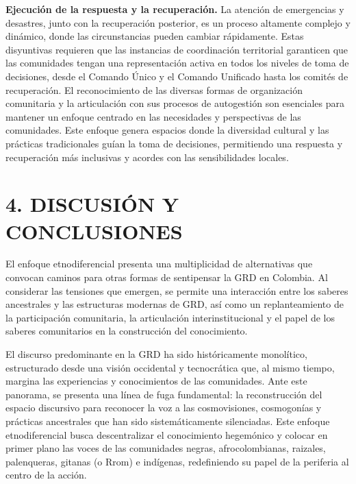\documentclass[
  spanish,
  letterpaper,
]{book}
\begin{document}
\textbf{Ejecución de la respuesta y la recuperación.} La atención de
emergencias y desastres, junto con la recuperación posterior, es un
proceso altamente complejo y dinámico, donde las circunstancias pueden
cambiar rápidamente. Estas disyuntivas requieren que las instancias de
coordinación territorial garanticen que las comunidades tengan una
representación activa en todos los niveles de toma de decisiones, desde
el Comando Único y el Comando Unificado hasta los comités de
recuperación. El reconocimiento de las diversas formas de organización
comunitaria y la articulación con sus procesos de autogestión son
esenciales para mantener un enfoque centrado en las necesidades y
perspectivas de las comunidades. Este enfoque genera espacios donde la
diversidad cultural y las prácticas tradicionales guían la toma de
decisiones, permitiendo una respuesta y recuperación más inclusivas y
acordes con las sensibilidades locales.


\chapter{4. DISCUSIÓN Y CONCLUSIONES}\label{discusiuxf3n-y-conclusiones}

El enfoque etnodiferencial presenta una multiplicidad de alternativas
que convocan caminos para otras formas de sentipensar la GRD en
Colombia. Al considerar las tensiones que emergen, se permite una
interacción entre los saberes ancestrales y las estructuras modernas de
GRD, así como un replanteamiento de la participación comunitaria, la
articulación interinstitucional y el papel de los saberes comunitarios
en la construcción del conocimiento.

El discurso predominante en la GRD ha sido históricamente monolítico,
estructurado desde una visión occidental y tecnocrática que, al mismo
tiempo, margina las experiencias y conocimientos de las comunidades.
Ante este panorama, se presenta una línea de fuga fundamental: la
reconstrucción del espacio discursivo para reconocer la voz a las
cosmovisiones, cosmogonías y prácticas ancestrales que han sido
sistemáticamente silenciadas. Este enfoque etnodiferencial busca
descentralizar el conocimiento hegemónico y colocar en primer plano las
voces de las comunidades negras, afrocolombianas, raizales, palenqueras,
gitanas (o Rrom) e indígenas, redefiniendo su papel de la periferia al
centro de la acción.
\end{document}
